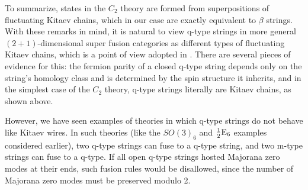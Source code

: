 To summarize, states in the $C_2$ theory are formed from superpositions of fluctuating Kitaev chains, which in our case are exactly equivalent to $\beta$ strings. 
With these remarks in mind, it 
is natural to view q-type strings in more general $(2+1)$-dimensional super fusion categories 
as different types of fluctuating Kitaev chains, which is a point of view adopted in \cite{tarantino2016,ware2016,kapustin2017}. 
There are several pieces of evidence for this: the fermion parity of a closed q-type string 
depends only on the string's homology class and is determined by the spin structure it inherits, 
and in the simplest case of the $C_2$ theory, q-type strings literally are Kitaev chains, as shown 
above. 

However, we have seen examples of theories in which q-type strings do not behave like Kitaev wires.
In such theories (like the $SO(3)_6$ and $\frac{1}{2}\text{E}_6$ examples considered earlier), two q-type
strings can fuse to a q-type string, and two m-type strings can fuse to a q-type. 
If all open q-type strings hosted Majorana zero modes at their ends, such fusion rules would 
be disallowed, since the number of Majorana zero modes must be preserved modulo 2.


 